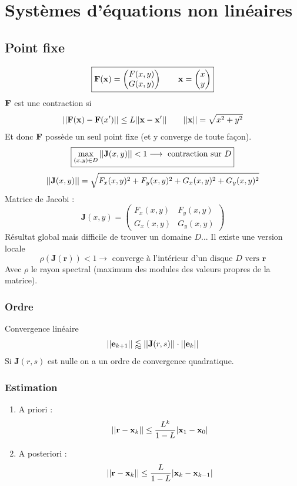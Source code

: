 \documentclass[resume]{subfiles}
\begin{document}
    \section{Systèmes d'équations non linéaires}
\subsection{Point fixe}
$$\boxed{\bold{F}(\bold{x})=\begin{pmatrix}
F(x,y)\\
G(x,y)
\end{pmatrix}\qquad \bold{x}=\begin{pmatrix}
x\\y
\end{pmatrix}}$$
$\bold{F}$ est une contraction si
$$\abs{\abs{\bold{F}(\bold{x})-\bold{F}(x')}}\leq L\abs{\abs{\bold{x}-\bold{x}'}}\qquad \abs{\abs{\bold{x}}}=\sqrt{x^2+y^2}$$
Et donc $\bold{F}$ possède un seul point fixe (et y converge de toute façon).
$$\boxed{\max_{(x,y)\in D}\abs{\abs{\mathbf{J}(x,y)}}<1\longrightarrow \text{ contraction sur }D}$$
$$\abs{\abs{\mathbf{J}(x,y)}}=\sqrt{F_x(x,y)^2+F_y(x,y)^2+G_x(x,y)^2+G_y(x,y)^2}$$
Matrice de Jacobi :
$$\mathbf{J}(x,y)=\begin{pmatrix}
F_x(x,y) & F_y(x,y)\\
G_x(x,y) & G_y(x,y)
\end{pmatrix}$$
Résultat global mais difficile de trouver un domaine $D$... Il existe une version locale
$$\rho(\mathbf{J}(\mathbf{r}))<1\longrightarrow\text{ converge à l'intérieur d'un disque } D\text{ vers }\mathbf{r}$$
Avec $\rho$ le rayon spectral (maximum des modules des valeurs propres de la matrice).
\subsubsection{Ordre}
Convergence linéaire
$$\abs{\abs{\mathbf{e}_{k+1}}}\lessapprox \abs{\abs{\mathbf{J}(r,s)}}\cdot \abs{\abs{\mathbf{e}_k}}$$
Si $\mathbf{J}(r,s)$ est nulle on a un ordre de convergence quadratique.
\subsubsection{Estimation}
\begin{enumerate}
\item A priori : 
$$\abs{\abs{\bold{r}-\bold{x}_k}}\leq \frac{L^{k}}{1-L}\abs{\bold{x}_1-\bold{x}_0}$$
\item A posteriori :
$$\abs{\abs{\bold{r}-\bold{x}_k}}\leq \frac{L}{1-L}\abs{\bold{x}_k-\bold{x}_{k-1}}$$
\end{enumerate}
\end{document}
